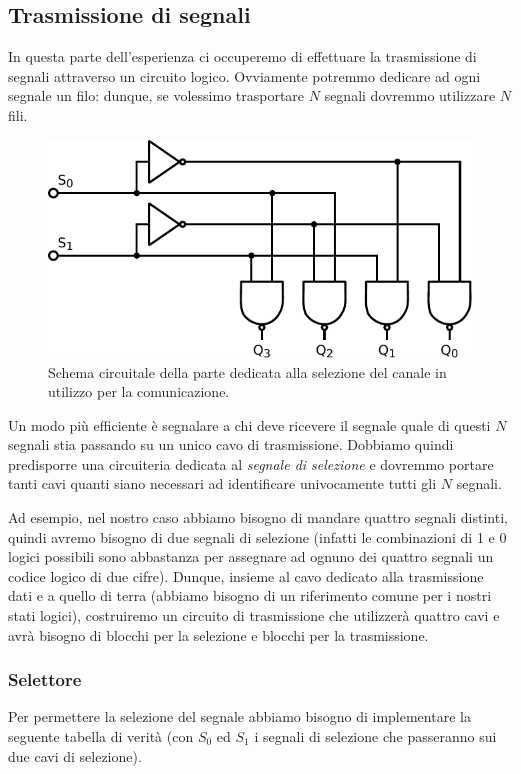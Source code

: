 \subsection{Trasmissione di segnali}

In questa parte dell'esperienza ci occuperemo di effettuare la trasmissione di segnali attraverso un circuito logico.
Ovviamente potremmo dedicare ad ogni segnale un filo: dunque, se volessimo trasportare $N$ segnali dovremmo utilizzare $N$ fili.

\begin{figure}
\centering
\includegraphics[width=.38\textwidth]{../E10/latex/selector.pdf}
\caption{Schema circuitale della parte dedicata alla selezione del canale in utilizzo per la comunicazione.}
\label{cir10:selector}
\end{figure}

Un modo più efficiente è segnalare a chi deve ricevere il segnale quale di questi $N$ segnali stia passando su un unico cavo di trasmissione.
Dobbiamo quindi predisporre una circuiteria dedicata al \textit{segnale di selezione} e dovremmo portare tanti cavi quanti siano necessari ad identificare univocamente tutti gli $N$ segnali.

Ad esempio, nel nostro caso abbiamo bisogno di mandare quattro segnali distinti, quindi avremo bisogno di due segnali di selezione (infatti le combinazioni di 1 e 0 logici possibili sono abbastanza per assegnare ad ognuno dei quattro segnali un codice logico di due cifre).
Dunque, insieme al cavo dedicato alla trasmissione dati e a quello di terra (abbiamo bisogno di un riferimento comune per i nostri stati logici), costruiremo un circuito di trasmissione che utilizzerà quattro cavi e avrà bisogno di blocchi per la selezione e blocchi per la trasmissione.

\subsubsection{Selettore}

Per permettere la selezione del segnale abbiamo bisogno di implementare la seguente tabella di verità (con $S_0$ ed $S_1$ i segnali di selezione che passeranno sui due cavi di selezione).

